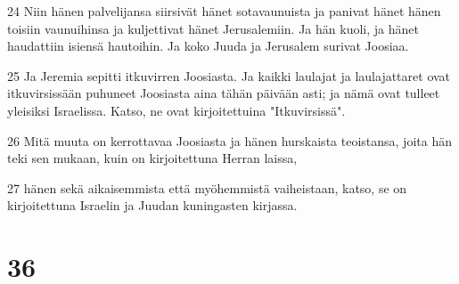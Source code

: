 \par 24 Niin hänen palvelijansa siirsivät hänet sotavaunuista ja panivat hänet hänen toisiin vaunuihinsa ja kuljettivat hänet Jerusalemiin. Ja hän kuoli, ja hänet haudattiin isiensä hautoihin. Ja koko Juuda ja Jerusalem surivat Joosiaa.
\par 25 Ja Jeremia sepitti itkuvirren Joosiasta. Ja kaikki laulajat ja laulajattaret ovat itkuvirsissään puhuneet Joosiasta aina tähän päivään asti; ja nämä ovat tulleet yleisiksi Israelissa. Katso, ne ovat kirjoitettuina "Itkuvirsissä".
\par 26 Mitä muuta on kerrottavaa Joosiasta ja hänen hurskaista teoistansa, joita hän teki sen mukaan, kuin on kirjoitettuna Herran laissa,
\par 27 hänen sekä aikaisemmista että myöhemmistä vaiheistaan, katso, se on kirjoitettuna Israelin ja Juudan kuningasten kirjassa.

\chapter{36}

